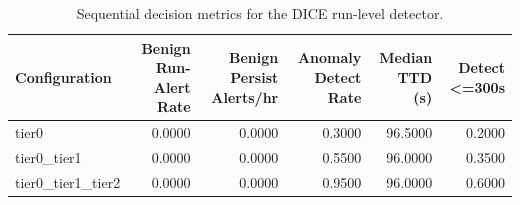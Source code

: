 \begin{table}[t]
\centering
\caption{Sequential decision metrics for the DICE run-level detector.}
\label{tab:dice_sequential_metrics}
\footnotesize
\begin{tabular}{lrrrrr}
\toprule
Configuration & Benign Run-Alert Rate & Benign Persist Alerts/hr & Anomaly Detect Rate & Median TTD (s) & Detect <=300s \\
\midrule
tier0 & 0.0000 & 0.0000 & 0.3000 & 96.5000 & 0.2000 \\
tier0_tier1 & 0.0000 & 0.0000 & 0.5500 & 96.0000 & 0.3500 \\
tier0_tier1_tier2 & 0.0000 & 0.0000 & 0.9500 & 96.0000 & 0.6000 \\
\bottomrule
\end{tabular}

\end{table}
